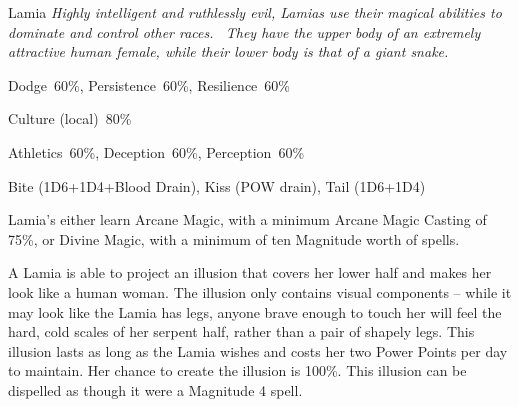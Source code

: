 \begin{monsterbox}{Lamia}
	\textit{Highly intelligent and ruthlessly evil, Lamias use their magical abilities to dominate and control other races.  They have the upper body of an extremely attractive human female, while their lower body is that of a giant snake. }\\
	\rpghline
	\basics[%
        hitpoints  = 14,
	majorwound = 7,
	damagemodifier = +1D4,
	powerpoints = 14,
	movementrate = 15m,
	armor = Scales (3AP),
	plunderrating = 5
	]
	\rpghline%
	\stats[ %
		STR = 3D6   (11),
		CON = 3D6   (11),
		DEX = 4D6   (14),
		SIZ = 3D6+6 (17),
		INT = 4D6   (14),
		POW = 4D6   (14),
		CHA = 3D6+6 (17)
	]
	\rpghline%
	\begin{rpg-monsteraction}[Resistances]
		Dodge~60\%, Persistence~60\%, Resilience~60\%
	\end{rpg-monsteraction}
	\begin{rpg-monsteraction}[Knowledge]
		Culture (local)~80\%
	\end{rpg-monsteraction}
	\begin{rpg-monsteraction}[Practical]
		Athletics~60\%, Deception~60\%, Perception~60\%
	\end{rpg-monsteraction}
	\begin{rpg-monsteraction}
		Bite (1D6+1D4+Blood Drain), Kiss (POW drain), Tail (1D6+1D4)
	\end{rpg-monsteraction}
	\begin{rpg-monsteraction}[Magic]
		Lamia’s either learn Arcane Magic, with a minimum Arcane Magic Casting of 75\%, or Divine Magic, with a minimum of ten Magnitude worth of spells. 
	\end{rpg-monsteraction}
	\begin{rpg-monsteraction}
		A Lamia is able to project an illusion that covers her lower half and makes her look like a human woman. The illusion only contains visual components – while it may look like the Lamia has legs, anyone brave enough to touch her will feel the hard, cold scales of her serpent half, rather than a pair of shapely legs. This illusion lasts as long as the Lamia wishes and costs her two Power Points per day to maintain. Her chance to create the illusion is 100\%. This illusion can be dispelled as though it were a Magnitude 4 spell.
	\end{rpg-monsteraction}
	\begin{rpg-monsteraction}

\end{rpg-monsteraction}
\end{monsterbox}
